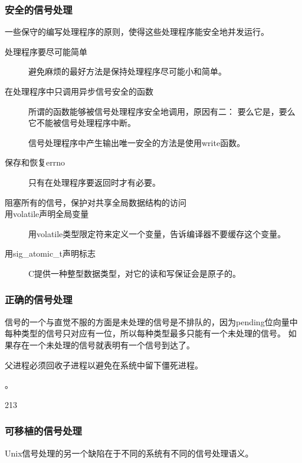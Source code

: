 {{        \subsubsection{安全的信号处理}
        {
            一些保守的编写处理程序的原则，使得这些处理程序能安全地并发运行。

            \begin{description}
                \item[处理程序要尽可能简单] 避免麻烦的最好方法是保持处理程序尽可能小和简单。
                \item[在处理程序中只调用异步信号安全的函数]
                {
                    所谓的函数能够被信号处理程序安全地调用，原因有二：
                    要么它是，要么它不能被信号处理程序中断。

                    信号处理程序中产生输出唯一安全的方法是使用write函数。
                }
                \item[保存和恢复errno] 只有在处理程序要返回时才有必要。
                \item[阻塞所有的信号，保护对共享全局数据结构的访问]
                \item[用volatile声明全局变量] 用volatile类型限定符来定义一个变量，告诉编译器不要缓存这个变量。
                \item[用sig_atomic_t声明标志] C提供一种整型数据类型，对它的读和写保证会是原子的。
            \end{description}
        }

        \subsubsection{正确的信号处理}
        {
            信号的一个与直觉不服的方面是未处理的信号是不排队的，因为pending位向量中每种类型的信号只对应有一位，所以每种类型最多只能有一个未处理的信号。
            如果存在一个未处理的信号就表明有一个信号到达了。

            父进程必须回收子进程以避免在系统中留下僵死进程。

            。

            \begin{practicec}
                213
            \end{practicec}
        }

        \subsubsection{可移植的信号处理}
        {
            Unix信号处理的另一个缺陷在于不同的系统有不同的信号处理语义。

}}}
